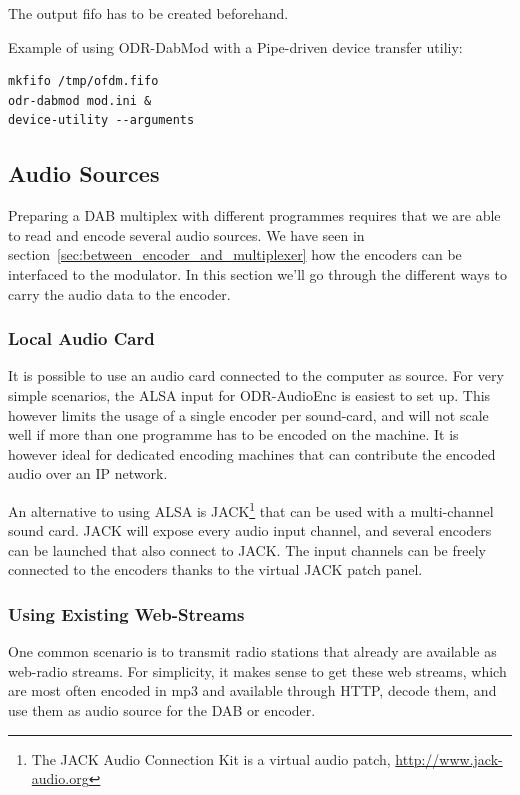 The output fifo has to be created beforehand.

Example of using ODR-DabMod with a Pipe-driven device transfer utiliy:

\begin{lstlisting}
mkfifo /tmp/ofdm.fifo
odr-dabmod mod.ini &
device-utility --arguments
\end{lstlisting}


\subsection{Audio Sources}
Preparing a DAB multiplex with different programmes requires that we are able to
read and encode several audio sources. We have seen in
section~\ref{sec:between_encoder_and_multiplexer} how the encoders can be
interfaced to the modulator. In this section we'll go through the different ways
to carry the audio data to the encoder.

\subsubsection{Local Audio Card}
It is possible to use an audio card connected to the computer as source. For
very simple scenarios, the ALSA input for ODR-AudioEnc is easiest to set up.
This however limits the usage of a single encoder per sound-card, and will not
scale well if more than one programme has to be encoded on the machine. It is
however ideal for dedicated encoding machines that can contribute the encoded
audio over an IP network.

An alternative to using ALSA is JACK\footnote{The JACK Audio Connection Kit is a
    virtual audio patch, \url{http://www.jack-audio.org}}
that can be used with a multi-channel sound card. JACK will expose every audio
input channel, and several encoders can be launched that also connect to JACK.
The input channels can be freely connected to the encoders thanks to the virtual
JACK patch panel.


\subsubsection{Using Existing Web-Streams}
\label{usingexistingwebstreams}
One common scenario is to transmit radio stations that already are available as
web-radio streams. For simplicity, it makes sense to get these web streams,
which are most often encoded in mp3 and available through HTTP, decode them, and
use them as audio source for the DAB or \dabplus encoder.

